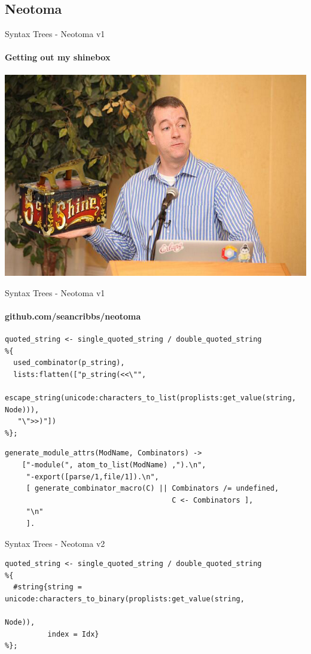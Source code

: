 \documentclass[c]{beamer}
\begin{document}
\subsection{Neotoma}
\begin{frame}[c]{Syntax Trees - Neotoma v1}
  \framesubtitle{Getting out my shinebox}
  \begin{center}
      \includegraphics[width=\textwidth]{shinebox.png}
  \end{center}
\end{frame}

\begin{frame}[fragile,t]{Syntax Trees - Neotoma v1}
  \framesubtitle{github.com/seancribbs/neotoma}
  \begin{lstlisting}
quoted_string <- single_quoted_string / double_quoted_string
%{
  used_combinator(p_string),
  lists:flatten(["p_string(<<\"",
   escape_string(unicode:characters_to_list(proplists:get_value(string, Node))),
   "\">>)"])
%};
  \end{lstlisting}
  \pause
  \begin{lstlisting}
generate_module_attrs(ModName, Combinators) ->
    ["-module(", atom_to_list(ModName) ,").\n",
     "-export([parse/1,file/1]).\n",
     [ generate_combinator_macro(C) || Combinators /= undefined,
                                       C <- Combinators ],
     "\n"
     ].
  \end{lstlisting}

\end{frame}

\begin{frame}[fragile,t]{Syntax Trees - Neotoma v2}
  \begin{lstlisting}
quoted_string <- single_quoted_string / double_quoted_string
%{
  #string{string = unicode:characters_to_binary(proplists:get_value(string,
                                                                    Node)),
          index = Idx}
%};
  \end{lstlisting}
\end{frame}
\end{document}
